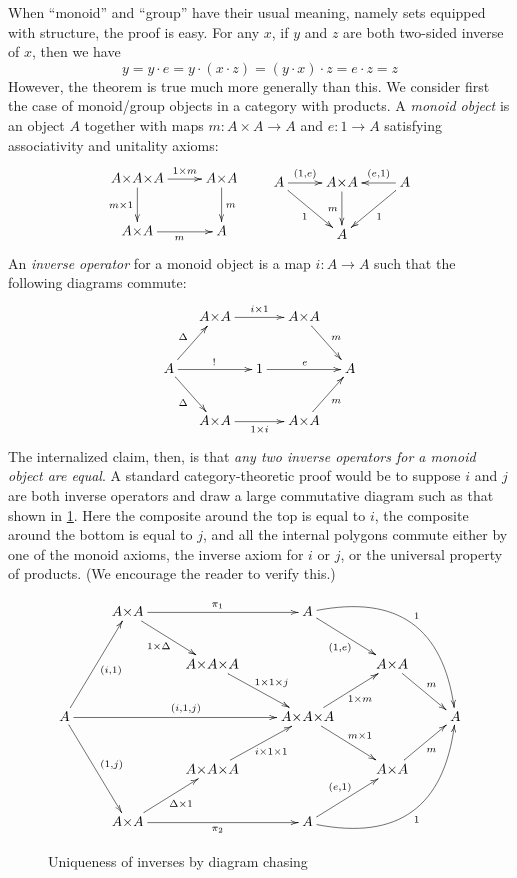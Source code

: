 When ``monoid'' and ``group'' have their usual meaning, namely sets equipped with structure, the proof is easy.
For any $x$, if $y$ and $z$ are both two-sided inverse of $x$, then we have
\begin{equation}
y = y \cdot e = y \cdot (x \cdot z) = (y\cdot x)\cdot z = e\cdot z = z\label{eq:invuniq-easy}
\end{equation}
However, the theorem is true much more generally than this.
We consider first the case of monoid/group objects in a category with products.
A \emph{monoid object} is an object $A$ together with maps $m:A\times A \to A$ and $e:1\to A$ satisfying associativity and unitality axioms:
\begin{equation}
  \vcenter{\xymatrix{
      A\times A\times A\ar[r]^-{1\times m}\ar[d]_{m\times 1} &
      A\times A\ar[d]^m\\
      A\times A\ar[r]_m &
      A
    }}
  \qquad
  \vcenter{\xymatrix{ A \ar[r]^-{(1,e)} \ar[dr]_{1} &
    A\times A \ar[d]_m & A \ar[l]_-{(e,1)} \ar[dl]^{1} \\
    & A }}
\end{equation}
An \emph{inverse operator} for a monoid object is a map $i:A\to A$ such that the following diagrams commute:
\begin{equation}
  \vcenter{\xymatrix@C=1pc{& A\times A \ar[rr]^{i\times 1} && A\times A \ar[dr]^m \\
      A \ar[ur]^{\Delta} \ar[dr]_{\Delta} \ar[rr]^{!} && 1 \ar[rr]^{e} && A \\
      & A\times A \ar[rr]_{1\times i} && A\times A \ar[ur]_{m}}}
\end{equation}
The internalized claim, then, is that \emph{any two inverse operators for a monoid object are equal}.
A standard category-theoretic proof would be to suppose $i$ and $j$ are both inverse operators and draw a large commutative diagram such as that shown in \cref{fig:uniqinv-diagram}.
Here the composite around the top is equal to $i$, the composite around the bottom is equal to $j$, and all the internal polygons commute either by one of the monoid axioms, the inverse axiom for $i$ or $j$, or the universal property of products.
(We encourage the reader to verify this.)

\begin{figure}
  \centering
  \[\xymatrix{
    & A\times A \ar[dr]_-{1\times\Delta} \ar[rr]^{\pi_1}
    && A \ar[dr]_{(1,e)} \ar@/^13mm/[ddrr]^{1}\\
    && A\times A\times A \ar[dr]^{1\times 1\times j}
    && A\times A \ar[dr]^m\\
    A \ar[rrr]^{(i,1,j)} \ar[uur]_{(i,1)} \ar[ddr]^{(1,j)} &&&
    A\times A\times A \ar[ur]_{1\times m} \ar[dr]^{m\times 1} && A\\
    && A\times A\times A \ar[ur]_{i\times 1\times 1}
    && A \times A \ar[ur]_m\\
    &  A\times A \ar[ur]_-{\Delta\times 1} \ar[rr]_{\pi_2}
    && A\ar[ur]^{(e,1)} \ar@/_13mm/[uurr]_{1}
    }
  \]
  \caption{Uniqueness of inverses by diagram chasing}
  \label{fig:uniqinv-diagram}
\end{figure}

